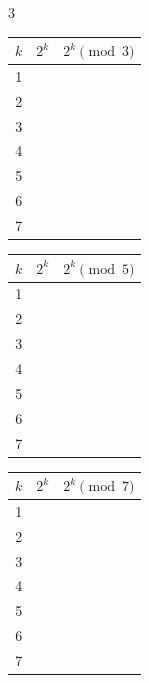 \documentclass[fleqn]{article}
\theoremstyle{definition}
\begin{document}
\vspace{.25cm}
\begin{multicols}{3}
\begin{tabular}{ c|c|c } 
$k$ &  $2^k$  &  $2^k \pmod 3$  \\ \hline
\rule{0pt}{5ex}  1         & \hspace{1.5cm}   &             \\ \hline
 \rule{0pt}{5ex} 2         &     &             \\ \hline
\rule{0pt}{5ex} 3          &    &             \\ \hline
\rule{0pt}{5ex} 4          &    &             \\ \hline
\rule{0pt}{5ex} 5          &    &             \\   \hline
\rule{0pt}{5ex} 6          &    &             \\   \hline
\rule{0pt}{5ex} 7          &    &             \\   \hline
\end{tabular} \columnbreak 

\begin{tabular}{ c|c|c } 
$k$ &  $2^k$  &  $2^k \pmod 5$  \\ \hline
\rule{0pt}{5ex}  1         & \hspace{1.5cm}   &             \\ \hline
 \rule{0pt}{5ex} 2         &     &             \\ \hline
\rule{0pt}{5ex} 3          &    &             \\ \hline
\rule{0pt}{5ex} 4          &    &             \\ \hline
\rule{0pt}{5ex} 5          &    &             \\   \hline
\rule{0pt}{5ex} 6          &    &             \\   \hline
\rule{0pt}{5ex} 7          &    &             \\   \hline
\end{tabular} \columnbreak 

\begin{tabular}{ c|c|c } 
$k$ &  $2^k$  &  $2^k \pmod 7$  \\ \hline
\rule{0pt}{5ex}  1         & \hspace{1.5cm}   &             \\ \hline
 \rule{0pt}{5ex} 2         &     &             \\ \hline
\rule{0pt}{5ex} 3          &    &             \\ \hline
\rule{0pt}{5ex} 4          &    &             \\ \hline
\rule{0pt}{5ex} 5          &    &             \\   \hline
\rule{0pt}{5ex} 6          &    &             \\   \hline
\rule{0pt}{5ex} 7          &    &             \\   \hline
\end{tabular} 

\end{multicols}
\end{document}
